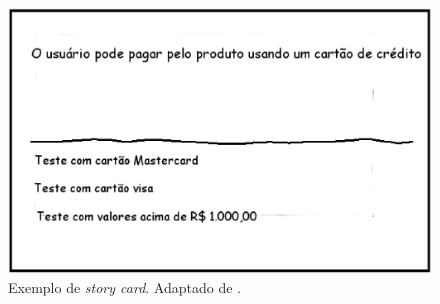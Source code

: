 \begin{figure}[ht]
	\centering
	\includegraphics[width=15 cm]{figuras/story_card.eps}
	\caption{Exemplo de \emph{story card}. Adaptado de \cite{cohn2004}.}
    	\label{story_card}
\end{figure}


